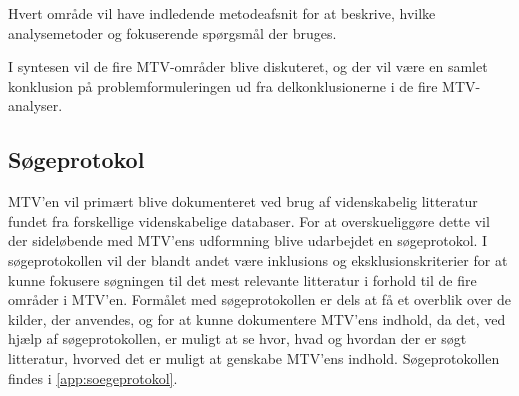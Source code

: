 Hvert område vil have indledende metodeafsnit for at beskrive, hvilke analysemetoder og fokuserende spørgsmål der bruges. 

I syntesen vil de fire MTV-områder blive diskuteret, og der vil være en samlet konklusion på problemformuleringen ud fra delkonklusionerne i de fire MTV-analyser. 

\subsection{Søgeprotokol}

MTV’en vil primært blive dokumenteret ved brug af videnskabelig litteratur fundet fra forskellige videnskabelige databaser. For at overskueliggøre dette vil der sideløbende med MTV’ens udformning blive udarbejdet en søgeprotokol. I søgeprotokollen vil der blandt andet være inklusions og eksklusionskriterier for at kunne fokusere søgningen til det mest relevante litteratur i forhold til de fire områder i MTV’en. Formålet med søgeprotokollen er dels at få et overblik over de kilder, der anvendes, og for at kunne dokumentere MTV’ens indhold, da det, ved hjælp af søgeprotokollen, er muligt at se hvor, hvad og hvordan der er søgt litteratur, hvorved det er muligt at genskabe MTV’ens indhold. Søgeprotokollen findes i \autoref{app:soegeprotokol}.











